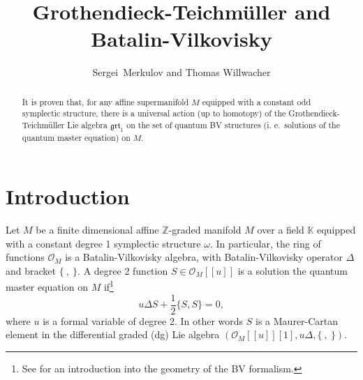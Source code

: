 \documentclass{amsart}
\theoremstyle{plain}
\theoremstyle{definition}
\begin{document}
 \sloppy

 \newenvironment{proo}{\begin{trivlist} \item{\sc {Proof.}}}
  {\hfill $\square$ \end{trivlist}}

\long

 \title{Grothendieck-Teichm\"uller  and Batalin-Vilkovisky}
  

 \author{ Sergei\ Merkulov and Thomas Willwacher}
\address{Sergei~Merkulov: Department of Mathematics, Stockholm University, 10691 Stockholm, Sweden, and Mathematics Research Unit, University of Luxembourg, Grand Duchy of Luxembourg (Current address)}
\address{Institute of Mathematics\\ University of Zurich\\ Winterthurerstrasse 190 \\ 8057 Zurich, Switzerland}


 \begin{abstract} It is proven that, for  any affine supermanifold $M$  equipped with a constant odd symplectic structure, there is a universal
  action (up to homotopy) of the  Grothendieck-Teichm\"uller Lie algebra ${{\mathfrak{{grt}}}_1}$ on the set of quantum  BV structures (i. e.\ solutions of the quantum master equation) on $M$.

\end{abstract}
 \maketitle
{}

{\large
\section{\bf Introduction}
}

Let $M$ be a finite dimensional affine ${{\mathbb Z}}$-graded manifold $M$  over a field ${{\mathbb K}}$ equipped with a constant degree 1 symplectic structure
${\omega}$. In particular, the ring of functions ${{\mathcal O}}_M$ is a Batalin-Vilkovisky algebra, with Batalin-Vilkovisky operator $\Delta$ and bracket $\{\ ,\ \}$. A degree 2 function $S\in {{\mathcal O}}_M[[{u}]]$ is a solution the quantum master equation on $M$ if\footnote{See \cite{Sc} for an introduction into the geometry of the BV formalism.}
$$
{u} \Delta S + \frac{1}{2}\{S,S\}=0,
$$
where $u$ is a formal variable of degree 2. In other words $S$ is a Maurer-Cartan element in the differential graded (dg) Lie algebra $\left({{\mathcal O}}_M[[{u}]][1], {u}\Delta, \{\ ,\ \}\right)$.
\end{document}
